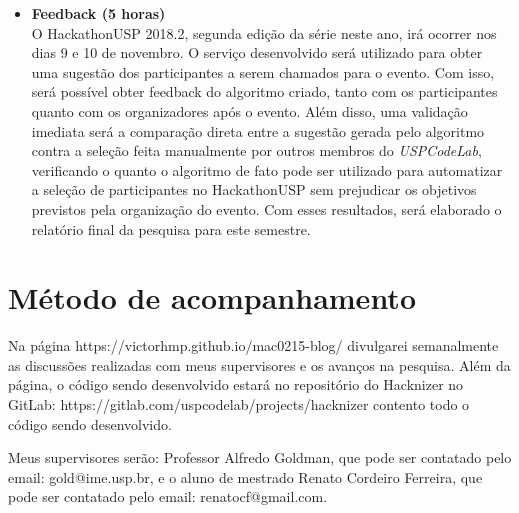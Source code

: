 \documentclass[10pt,twoside,a4paper]{article}
\begin{document}
\begin{itemize}
    \item \textbf{Feedback (5 horas)} \\
        O HackathonUSP 2018.2, segunda edição da série neste ano, irá ocorrer nos dias 9 e 10 de novembro. O serviço desenvolvido será utilizado para obter uma sugestão dos participantes a serem chamados para o evento. Com isso, será possível obter feedback do algoritmo criado, tanto com os participantes quanto com os organizadores após o evento. Além disso, uma validação imediata será a comparação direta entre a sugestão gerada pelo algoritmo contra a seleção feita manualmente por outros membros do \textit{USPCodeLab}, verificando o quanto o algoritmo de fato pode ser utilizado para automatizar a seleção de participantes no HackathonUSP sem prejudicar os objetivos previstos pela organização do evento.
        Com esses resultados, será elaborado o relatório final da pesquisa para este semestre.

  \end{itemize}
  

\section{Método de acompanhamento}

    Na página https://victorhmp.github.io/mac0215-blog/ divulgarei semanalmente as discussões realizadas com meus supervisores e os avanços na pesquisa. Além da página, o código sendo desenvolvido estará no repositório do Hacknizer no GitLab: https://gitlab.com/uspcodelab/projects/hacknizer contento todo o código sendo desenvolvido.
    
    Meus supervisores serão: Professor Alfredo Goldman, que pode ser contatado pelo email: gold@ime.usp.br, e o aluno de mestrado Renato Cordeiro Ferreira, que pode ser contatado pelo email: renatocf@gmail.com.




\end{document}

